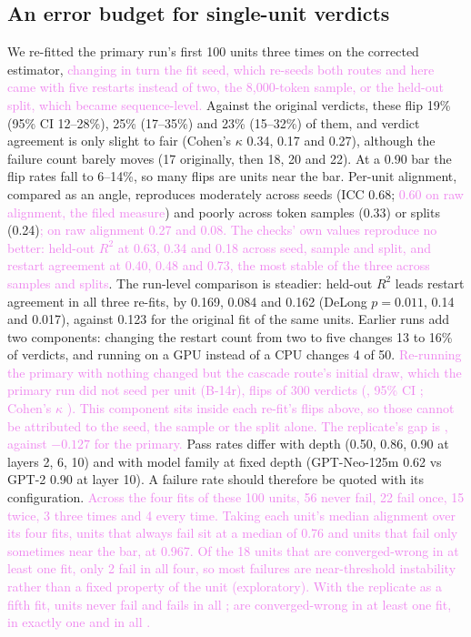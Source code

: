 \documentclass[10pt]{article}
\newcommand{\draft}[1]{\textcolor{violet}{#1}}
\begin{document}
\subsection{An error budget for single-unit verdicts}
\label{sec:budget}
We re-fitted the primary run's first 100 units three times on the corrected estimator,
\draft{changing in turn the fit seed, which re-seeds both routes and here came with five
restarts instead of two, the 8{,}000-token sample, or the held-out split, which became
sequence-level.} Against
the original verdicts, these flip 19\% (95\% CI 12--28\%), 25\% (17--35\%) and 23\% (15--32\%)
of them, and verdict agreement is only slight to fair (Cohen's $\kappa$ 0.34, 0.17 and 0.27),
although the failure count barely moves (17 originally, then 18, 20 and 22). At a 0.90 bar the
flip rates fall to 6--14\%, so many flips are units near the bar. Per-unit alignment, compared
as an angle, reproduces moderately across seeds (ICC 0.68; \draft{0.60 on raw alignment, the
filed measure}) and poorly across token samples
(0.33) or splits (0.24)\draft{; on raw alignment 0.27 and 0.08. The checks' own values
reproduce no better: held-out $R^2$ at 0.63, 0.34 and 0.18 across seed, sample and split, and
restart agreement at 0.40, 0.48 and 0.73, the most stable of the three across samples and
splits}. The run-level comparison is steadier: held-out $R^2$ leads restart
agreement in all three re-fits, by 0.169, 0.084 and 0.162 (DeLong $p = 0.011$, 0.14 and
0.017), against 0.123 for the original fit of the same units. Earlier runs add two
components: changing the restart count from two to five changes 13 to 16\% of verdicts, and
running on a GPU instead of a CPU changes 4 of 50. \draft{Re-running the primary with nothing
changed but the cascade route's initial draw, which the primary run did not seed per unit
(B-14r), flips \bRFlips{} of 300 verdicts (\bRFlipRate, 95\% CI \bRFlipCI; Cohen's $\kappa$
\bRKappa). This component sits inside each re-fit's flips above, so those cannot be attributed
to the seed, the sample or the split alone. The replicate's gap is \bRDelta{} \bRCI, against
$-0.127$ for the primary.} Pass rates differ with depth (0.50, 0.86,
0.90 at layers 2, 6, 10) and with model family at fixed depth (GPT-Neo-125m 0.62 vs GPT-2
0.90 at layer 10). A failure rate should therefore be quoted with its configuration.
\draft{Across the four fits of these 100 units, 56 never fail, 22 fail once, 15 twice, 3 three
times and 4 every time. Taking each unit's median alignment over its four fits, units that
always fail sit at a median of 0.76 and units that fail only sometimes near the bar, at 0.967. Of the 18 units that are converged-wrong in at
least one fit, only 2 fail in all four, so most failures are near-threshold instability rather
than a fixed property of the unit (exploratory).} \draft{With the replicate as a fifth fit,
\csNever{} units never fail and \csAll{} fails in all \csFits; \csCwAny{} are converged-wrong in
at least one fit, \csCwOnce{} in exactly one and \csCwAll{} in all \csFits.}
\end{document}
